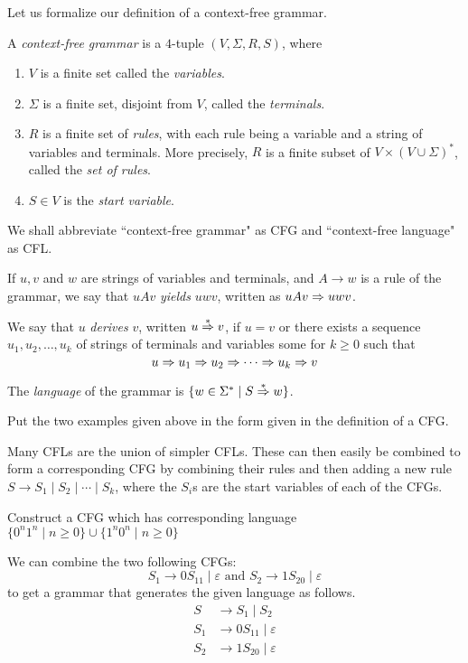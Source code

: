 \vspace{3mm}
Let us formalize our definition of a context-free grammar.
\begin{definition}
A \textit{context-free grammar} is a $4$-tuple $(V,\Sigma,R,S)$, where
\begin{enumerate}
    \item $V$ is a finite set called the \textit{variables}.
    \item $\Sigma$ is a finite set, disjoint from $V$, called the \textit{terminals}.
    \item $R$ is a finite set of \textit{rules}, with each rule being a variable and a string of variables and terminals. More precisely, $R$ is a finite subset of $V\times (V\cup\Sigma)^*$, called the \textit{set of rules}.
    \item $S\in V$ is the \textit{start variable}.
\end{enumerate}
\end{definition}

We shall abbreviate ``context-free grammar" as CFG and ``context-free language" as CFL.

If $u,v$ and $w$ are strings of variables and terminals, and $A\to w$ is a rule of the grammar, we say that $uAv$ \textit{yields} $uwv$, written as $uAv\Rightarrow uwv$.

We say that $u$ \textit{derives} $v$, written $u\overset{*}{\Rightarrow} v$, if $u=v$ or there exists a sequence $u_1,u_2,\ldots,u_k$ of strings of terminals and variables some for $k\geq 0$ such that $$u\Rightarrow u_1\Rightarrow u_2 \Rightarrow\cdots\Rightarrow u_k\Rightarrow v$$

The \textit{language} of the grammar is $\{w\in\Sigma^*\mid S\overset{*}{\Rightarrow} w\}$.

\begin{exercise}
Put the two examples given above in the form given in the definition of a CFG.
\end{exercise}

Many CFLs are the union of simpler CFLs. These can then easily be combined to form a corresponding CFG by combining their rules and then adding a new rule $S\to S_1\mid S_2\mid\cdots\mid S_k$, where the $S_i$s are the start variables of each of the CFGs.

\begin{exercise}
Construct a CFG which has corresponding language $\{0^n1^n\mid n\geq 0\}\cup\{1^n0^n\mid n\geq 0\}$
\end{exercise}
\begin{solution}
We can combine the two following CFGs:
$$S_1\to 0S_11\mid\varepsilon \text{ and } S_2\to 1S_20\mid\varepsilon$$
to get a grammar that generates the given language as follows.
\begin{align*}
    S&\to S_1\mid S_2 \\
    S_1&\to 0S_11\mid\varepsilon \\
    S_2&\to 1S_20\mid\varepsilon
\end{align*}
\end{solution}

